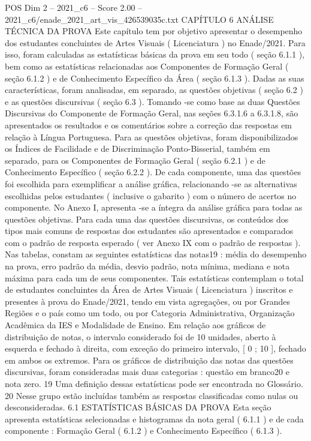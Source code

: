 \begin{textsample}{POS Dim 2 – 2021\_c6 – Score 2.00 – 2021\_c6/enade\_2021\_art\_vis\_426539035c.txt}  \label{ex:f2_pos_177}
CAPÍTULO 6 ANÁLISE TÉCNICA DA PROVA Este capítulo tem por objetivo apresentar o desempenho dos estudantes concluintes de Artes Visuais ( Licenciatura ) no Enade/2021.
Para isso, foram calculadas as estatísticas básicas da prova em seu todo ( seção 6.1.1 ), bem como as estatísticas relacionadas aos Componentes de Formação Geral ( seção 6.1.2 ) e de Conhecimento Específico da Área ( seção 6.1.3 ).
Dadas as suas características, foram analisadas, em separado, as questões objetivas ( seção 6.2 ) e as questões discursivas ( seção 6.3 ).
Tomando -se como base as duas Questões Discursivas do Componente de Formação Geral, nas seções 6.3.1.6 a 6.3.1.8, são apresentados os resultados e os comentários sobre a correção das respostas em relação à Língua Portuguesa.
Para as questões objetivas, foram disponibilizados os Índices de Facilidade e de Discriminação Ponto-Bisserial, também em separado, para os Componentes de Formação Geral ( seção 6.2.1 ) e de Conhecimento Específico ( seção 6.2.2 ).
De cada componente, uma das questões foi escolhida para exemplificar a análise gráfica, relacionando -se as alternativas escolhidas pelos estudantes ( inclusive o gabarito ) com o número de acertos no componente.
No Anexo I, apresenta -se a íntegra da análise gráfica para todas as questões objetivas.
Para cada uma das questões discursivas, os conteúdos dos tipos mais comuns de respostas dos estudantes são apresentados e comparados com o padrão de resposta esperado ( ver Anexo IX com o padrão de respostas ).
Nas tabelas, constam as seguintes estatísticas das notas19 : média do desempenho na prova, erro padrão da média, desvio padrão, nota mínima, mediana e nota máxima para cada um de seus componentes.
Tais estatísticas contemplam o total de estudantes concluintes da Área de Artes Visuais ( Licenciatura ) inscritos e presentes à prova do Enade/2021, tendo em vista agregações, ou por Grandes Regiões e o país como um todo, ou por Categoria Administrativa, Organização Acadêmica da IES e Modalidade de Ensino.
Em relação aos gráficos de distribuição de notas, o intervalo considerado foi de 10 unidades, aberto à esquerda e fechado à direita, com exceção do primeiro intervalo, [ 0 ; 10 ], fechado em ambos os extremos.
Para os gráficos de distribuição das notas das questões discursivas, foram consideradas mais duas categorias : questão em branco20 e nota zero. 19 Uma definição dessas estatísticas pode ser encontrada no Glossário. 20 Nesse grupo estão incluídas também as respostas classificadas como nulas ou desconsideradas. 6.1 ESTATÍSTICAS BÁSICAS DA PROVA Esta seção apresenta estatísticas selecionadas e histogramas da nota geral ( 6.1.1 ) e de cada componente : Formação Geral ( 6.1.2 ) e Conhecimento Específico ( 6.1.3 ).

\end{textsample}

